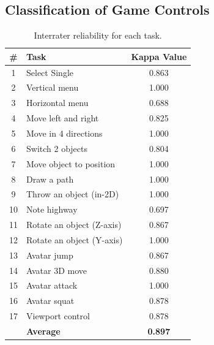 \documentclass{sigchi}
\newcommand\tabhead[1]{\small\textbf{#1}}
\begin{document}
  \subsection{Classification of Game Controls}

   \begin{table}
    \centering
    \begin{tabular}{|c|l|c|}
      \hline
      \tabhead{\#} &
      \multicolumn{1}{|p{0.4\columnwidth}|}{\centering\tabhead{Task}} &
      \multicolumn{1}{|p{0.2\columnwidth}|}{\centering\tabhead{Kappa Value}} \\
      \hline
      1 & Select Single & 0.863\\
      \hline
      2 & Vertical menu & 1.000\\
      \hline
      3 & Horizontal menu & 0.688\\
      \hline
      4 & Move left and right & 0.825\\
      \hline
      5 & Move in 4 directions & 1.000\\
      \hline
      6 & Switch 2 objects & 0.804\\
      \hline
      7 & Move object to position & 1.000\\
      \hline
      8 & Draw a path & 1.000\\
      \hline
      9 & Throw an object (in-2D) & 1.000\\
      \hline
      10 & Note highway & 0.697\\
      \hline
      11 & Rotate an object (Z-axis) & 0.867 \\
      \hline
      12 & Rotate an object (Y-axis) & 1.000\\
      \hline
      13 & Avatar jump & 0.867\\
      \hline
      14 & Avatar 3D move & 0.880\\
      \hline
      15 & Avatar attack & 1.000\\
      \hline
      16 & Avatar squat & 0.878\\
      \hline
      17 & Viewport control & 0.878\\
      \hline
      & \bf{Average} & \bf{0.897}\\
      \hline

    \end{tabular}
    \caption{Interrater reliability for each task.}
    \label{tab:kappa}
  \end{table}
\end{document}
